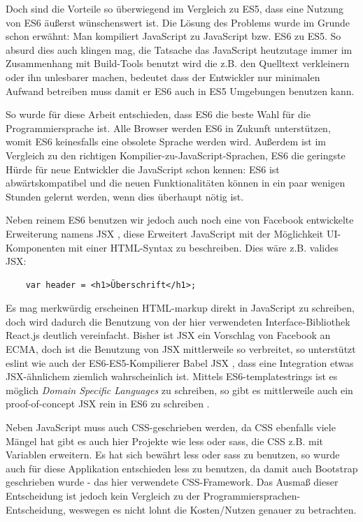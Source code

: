 \documentclass[12pt,twoside]{book}
\begin{document}
Doch sind die Vorteile so überwiegend im Vergleich zu ES5, dass eine Nutzung von ES6 äußerst wünschenswert ist.
Die Lösung des Problems wurde im Grunde schon erwähnt: Man kompiliert JavaScript zu JavaScript bzw. ES6 zu ES5.
So absurd dies auch klingen mag, die Tatsache das JavaScript heutzutage immer im Zusammenhang mit Build-Tools benutzt wird die z.B. den Quelltext verkleinern oder ihn unlesbarer machen, bedeutet dass der Entwickler nur minimalen Aufwand betreiben muss damit er ES6 auch in ES5 Umgebungen benutzen kann.

So wurde für diese Arbeit entschieden, dass ES6 die beste Wahl für die Programmiersprache ist. Alle Browser werden ES6 in Zukunft unterstützen, womit ES6 keinesfalls eine obsolete Sprache werden wird. Außerdem ist im Vergleich zu den richtigen Kompilier-zu-JavaScript-Sprachen, ES6 die geringste Hürde für neue Entwickler die JavaScript schon kennen: ES6 ist abwärtskompatibel und die neuen Funktionalitäten können in ein paar wenigen Stunden gelernt werden, wenn dies überhaupt nötig ist.

Neben reinem ES6 benutzen wir jedoch auch noch eine von Facebook entwickelte Erweiterung namens JSX \cite{jsx}, diese Erweitert JavaScript mit der Möglichkeit UI-Komponenten mit einer HTML-Syntax zu beschreiben. Dies wäre z.B. valides JSX:

\begin{verbatim}
	var header = <h1>Überschrift</h1>;
\end{verbatim}

Es mag merkwürdig erscheinen HTML-markup direkt in JavaScript zu schreiben, doch wird dadurch die Benutzung von der hier verwendeten Interface-Bibliothek React.js deutlich vereinfacht.
Bisher ist JSX ein Vorschlag von Facebook an ECMA, doch ist die Benutzung von JSX mittlerweile so verbreitet, so unterstützt eslint \cite{eslint} wie auch der ES6-ES5-Kompilierer Babel JSX \cite{babel}, dass eine Integration etwas JSX-ähnlichem ziemlich wahrscheinlich ist.
Mittels ES6-templatestrings ist es möglich \textit{Domain Specific Languages} zu schreiben, so gibt es mittlerweile auch ein proof-of-concept JSX rein in ES6 zu schreiben \cite{templatestrings}.

Neben JavaScript muss auch CSS-geschrieben werden, da CSS ebenfalls viele Mängel hat gibt es auch hier Projekte wie less oder sass, die CSS z.B. mit Variablen erweitern. Es hat sich bewährt less oder sass zu benutzen, so wurde auch für diese Applikation entschieden less zu benutzen, da damit auch Bootstrap geschrieben wurde - das hier verwendete CSS-Framework.
Das Ausmaß dieser Entscheidung ist jedoch kein Vergleich zu der Programmiersprachen-Entscheidung, weswegen es nicht lohnt die Kosten/Nutzen genauer zu betrachten.
\end{document}
